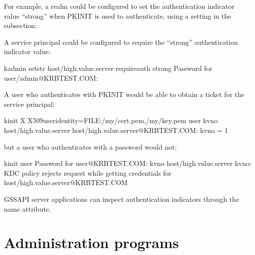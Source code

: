 \documentclass[letterpaper,10pt,english]{sphinxmanual}
\begin{document}
\sphinxAtStartPar
For example, a realm could be configured to set the authentication
indicator value “strong” when PKINIT is used to authenticate, using a
setting in the {\hyperref[\detokenize{admin/conf_files/kdc_conf:kdc-realms}]{}} subsection:

\begin{sphinxVerbatim}[commandchars=\\\{\}]
  
\end{sphinxVerbatim}

\sphinxAtStartPar
A service principal could be configured to require the “strong”
authentication indicator value:

\begin{sphinxVerbatim}[commandchars=\\\{\}]
\PYGZdl{} kadmin setstr host/high.value.server require\PYGZus{}auth strong
Password for user/admin@KRBTEST.COM:
\end{sphinxVerbatim}

\sphinxAtStartPar
A user who authenticates with PKINIT would be able to obtain a ticket
for the service principal:

\begin{sphinxVerbatim}[commandchars=\\\{\}]
\PYGZdl{} kinit \PYGZhy{}X X509\PYGZus{}user\PYGZus{}identity=FILE:/my/cert.pem,/my/key.pem user
\PYGZdl{} kvno host/high.value.server
host/high.value.server@KRBTEST.COM: kvno = 1
\end{sphinxVerbatim}

\sphinxAtStartPar
but a user who authenticates with a password would not:

\begin{sphinxVerbatim}[commandchars=\\\{\}]
\PYGZdl{} kinit user
Password for user@KRBTEST.COM:
\PYGZdl{} kvno host/high.value.server
kvno: KDC policy rejects request while getting credentials for
  host/high.value.server@KRBTEST.COM
\end{sphinxVerbatim}

\sphinxAtStartPar
GSSAPI server applications can inspect authentication indicators
through the  name
attribute.

\sphinxstepscope


\chapter{Administration  programs}
\label{\detokenize{admin/admin_commands/index:administration-programs}}\label{\detokenize{admin/admin_commands/index::doc}}
\sphinxstepscope
\end{document}
